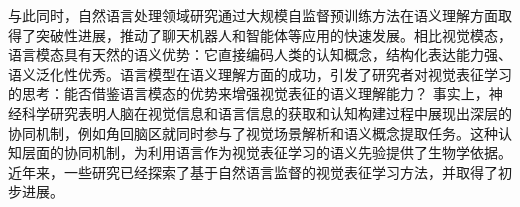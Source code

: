 与此同时，自然语言处理领域研究通过大规模自监督预训练方法\cite{BERT,gpt2}在语义理解方面取得了突破性进展，推动了聊天机器人和智能体等应用的快速发展。相比视觉模态，语言模态具有天然的语义优势：它直接编码人类的认知概念，结构化表达能力强、语义泛化性优秀。语言模型在语义理解方面的成功，引发了研究者对视觉表征学习的思考：能否借鉴语言模态的优势来增强视觉表征的语义理解能力？
事实上，神经科学研究表明人脑在视觉信息和语言信息的获取和认知构建过程中展现出深层的协同机制\cite{bemis2013basic}，例如角回脑区就同时参与了视觉场景解析和语义概念提取任务。这种认知层面的协同机制，为利用语言作为视觉表征学习的语义先验提供了生物学依据。近年来，一些研究\cite{desai2021virtex,sariyildiz2020learning}已经探索了基于自然语言监督的视觉表征学习方法，并取得了初步进展。


